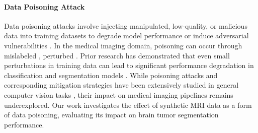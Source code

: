 \paragraph{Data Poisoning Attack}  
Data poisoning attacks involve injecting manipulated, low-quality, or malicious data into training datasets to degrade model performance or induce adversarial vulnerabilities \citep{yerlikaya2022data, fan2022survey}. In the medical imaging domain, poisoning can occur through mislabeled \citep{tolpegin2020data, lin2021active}, perturbed \citep{martinelli2023data, bortsova2021adversarial}. Prior research has demonstrated that even small perturbations in training data can lead to significant performance degradation in classification and segmentation models \citep{szegedy2013intriguing, chakraborty2021survey}. While poisoning attacks and corresponding mitigation strategies \citep{goldblum2022dataset, schwarzschild2021just, fu2024poisonbench, li2024scisafeeval} have been extensively studied in general computer vision tasks \citep{wei2024physical, akhtar2018threat}, their impact on medical imaging pipelines remains underexplored. Our work investigates the effect of synthetic MRI data as a form of data poisoning, evaluating its impact on brain tumor segmentation performance.
